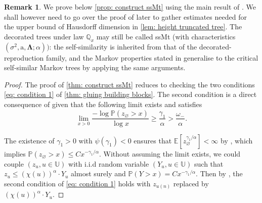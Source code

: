 \documentclass[12pt]{article}
\numberwithin{equation}{section}
\theoremstyle{plain}
\theoremstyle{definition}
\newtheorem{rem}[thm]{Remark}
\begin{document}
\begin{rem} We prove below \cref{prop: construct ssMt} using the main result of \cite{AidekonElie2024Bodt}. We shall however need to go over the proof of \cite{AidekonElie2024Bodt} later to gather estimates needed for the upper bound of Hausdorff dimension in \cref{lem: height truncated tree}. The decorated trees under law $\mathbb{Q}_x$ may still be called ssMt (with characteristics $(\sigma^2, \mathrm{a}, \boldsymbol\Lambda ; \alpha))$: the self-similarity is inherited from that of the decorated-reproduction family, and the Markov properties stated in \cite[Chapter 4]{BertoinJean2024SMta} generalise to the critical self-similar Markov trees by applying the same arguments.
\end{rem}
\begin{proof}
The proof of \cref{thm: construct ssMt} reduces to checking the two conditions \eqref{eq: condition 1} of \cref{thm: gluing building blocks}. The second condition is a direct consequence of \cite[Theorem 1.3]{AidekonElie2024Bodt} given that the following limit exists and satisfies
\[\lim_{x>0} \frac{-\log\mathbb{P}(z_{\varnothing}>x)}{\log x} \geq \frac{\gamma_1}{\alpha} > \frac{\omega_-}{\alpha}. \]

\noindent The existence of $\gamma_1>0$ with $\psi(\gamma_1) < 0$ ensures that $\mathbb{E}[z_{\varnothing}^{\gamma_1/\alpha}] < \infty$ by \cite[Lemma 9.1]{BertoinJean2024SMta}, which implies $\mathbb{P}(z_{\varnothing}>x)\leq Cx^{-\gamma_1/\alpha}$. Without assuming the limit exists, we could couple $(z_{u}, u\in\mathbb{U})$ with i.i.d random variable $(Y_u, u\in\mathbb{U})$ such that $z_u \leq (\chi(u))^{\alpha}\cdot Y_u$ almost surely and $\mathbb{P}(Y>x) = Cx^{-\gamma_1/\alpha}$. Then by \cite[Theorem 1.3]{AidekonElie2024Bodt}, the second condition of \eqref{eq: condition 1} holds with $z_{u(n)}$ replaced by $(\chi(u))^{\alpha}\cdot Y_u$.



\end{proof}
\end{document}
